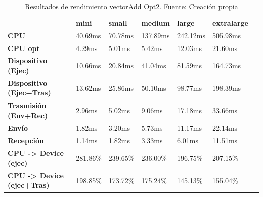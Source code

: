 \begin{table}[H]
    \centering
    \begin{tabular}{lllllll}
    \rowcolor[HTML]{DAE8FC} \ &  \textbf{mini} &  \textbf{small} &  \textbf{medium} &  \textbf{	large} &  \textbf{	extralarge} \\
    \cellcolor[HTML]{DAE8FC} \textbf{CPU} & 40.69ms & 70.78ms & 137.89ms & 	242.12ms & 	505.98ms \\
    \rowcolor[HTML]{EFEFEF} \cellcolor[HTML]{DAE8FC} \textbf{CPU opt} & 4.29ms & 5.01ms & 5.42ms & 	12.03ms & 	21.60ms \\
    \cellcolor[HTML]{DAE8FC} \textbf{Dispositivo (Ejec)} & 10.66ms & 20.84ms & 41.04ms & 	81.59ms & 	164.73ms \\
    \rowcolor[HTML]{EFEFEF} \cellcolor[HTML]{DAE8FC} \textbf{Dispositivo (Ejec+Tras)} & 13.62ms & 25.86ms & 50.10ms & 	98.77ms & 	198.39ms \\
    \cellcolor[HTML]{DAE8FC} \textbf{Trasmisión (Env+Rec)} & 2.96ms & 5.02ms & 9.06ms & 	17.18ms & 	33.66ms \\
    \rowcolor[HTML]{EFEFEF} \cellcolor[HTML]{DAE8FC} \textbf{Envío} & 1.82ms & 3.20ms & 5.73ms & 	11.17ms & 	22.14ms \\
    \cellcolor[HTML]{DAE8FC} \textbf{Recepción} & 1.14ms & 1.82ms & 3.33ms & 	6.01ms & 	11.51ms \\
    \rowcolor[HTML]{EFEFEF} \cellcolor[HTML]{DAE8FC} \textbf{CPU -> Device (ejec)} & 281.86\% & 239.65\% & 236.00\% & 	196.75\% & 	207.15\% \\
    \cellcolor[HTML]{DAE8FC} \textbf{CPU -> Device (ejec+Tras)} & 198.85\% & 173.72\% & 175.24\% & 	145.13\% & 	155.04\% \\
    \end{tabular}
    \caption[Resultados de rendimiento vectorAdd Opt2]{{Resultados de rendimiento vectorAdd Opt2. Fuente: Creación propia}}
    \label{table_test_vectorAdd_Opt2_hw_performanceResults}
\end{table}